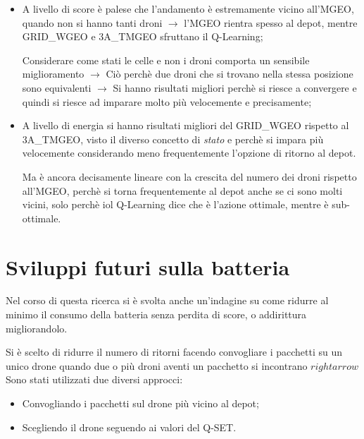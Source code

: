 \documentclass[12pt]{article}
\begin{document}
\begin{itemize}

    \item A livello di score è palese che l'andamento è estremamente vicino all'MGEO, quando non si hanno tanti droni $\rightarrow$ l'MGEO rientra spesso al depot, mentre GRID\_WGEO e 3A\_TMGEO sfruttano il Q-Learning; 
    
    Considerare come stati le celle e non i droni comporta un sensibile miglioramento $\rightarrow$ Ciò perchè due droni che si trovano nella stessa posizione sono equivalenti $\rightarrow$ Si hanno risultati migliori perchè si riesce a convergere e quindi si riesce ad imparare molto più velocemente e precisamente;
    
    \item A livello di energia si hanno risultati migliori del GRID\_WGEO rispetto al 3A\_TMGEO, visto il diverso concetto di \textit{stato} e perchè si impara più velocemente considerando meno frequentemente l'opzione di ritorno al depot.
    
    Ma è ancora decisamente lineare con la crescita del numero dei droni rispetto all'MGEO, perchè si torna frequentemente al depot anche se ci sono molti vicini, solo perchè iol Q-Learning dice che è l'azione ottimale, mentre è sub-ottimale.

\end{itemize}


\section{Sviluppi futuri sulla batteria}

Nel corso di questa ricerca si è svolta anche un'indagine su come ridurre al minimo il consumo della batteria senza perdita di score, o addirittura migliorandolo.

Si è scelto di ridurre il numero di ritorni facendo convogliare i pacchetti su un unico drone quando due o più droni aventi un pacchetto si incontrano $rightarrow$ Sono stati utilizzati due diversi approcci: 

\begin{itemize}

    \item Convogliando i pacchetti sul drone più vicino al depot;
    
    \item Scegliendo il drone seguendo ai valori del Q-SET.
    
\end{itemize}
\end{document}
